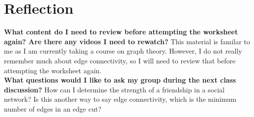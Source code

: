 \documentclass[article, 12pt]{article}
\theoremstyle{definition}
\begin{document}
    \section{Reflection}
    \textbf{What content do I need to review before attempting the worksheet again? Are there any videos I need to rewatch?}
    This material is familar to me as I am currently taking a course on graph theory. However, I do not really remember much about edge connectivity, so I will need to review that before attempting the worksheet again.
    \\[12pt]
    \textbf{What questions would I like to ask my group during the next class discussion?}
    How can I determine the strength of a friendship in a social network? Is this another way to say edge connectivity, which is the minimum number of edges in an edge cut?
\end{document}
